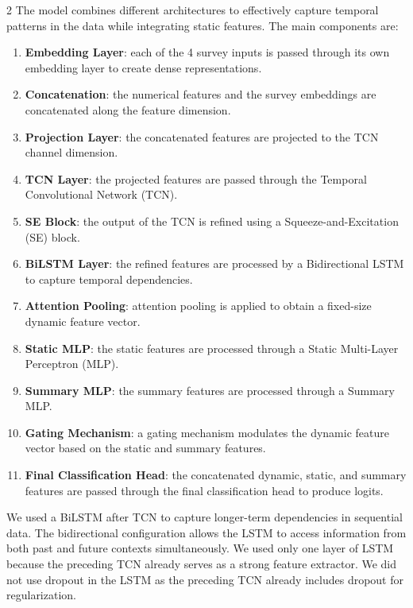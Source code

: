 \documentclass[11pt]{article}
\begin{document}
\begin{multicols}{2}
        The model combines different architectures to effectively capture temporal patterns in the data while integrating static features. The main components are:
        \begin{enumerate}[nosep]
            \item \textbf{Embedding Layer}: each of the 4 survey inputs is passed through its own embedding layer to create dense representations.
            \item \textbf{Concatenation}: the numerical features and the survey embeddings are concatenated along the feature dimension.
            \item \textbf{Projection Layer}: the concatenated features are projected to the TCN channel dimension.
            \item \textbf{TCN Layer}: the projected features are passed through the Temporal Convolutional Network (TCN).
            \item \textbf{SE Block}: the output of the TCN is refined using a Squeeze-and-Excitation (SE) block.
            \item \textbf{BiLSTM Layer}: the refined features are processed by a Bidirectional LSTM to capture temporal dependencies.
            \item \textbf{Attention Pooling}: attention pooling is applied to obtain a fixed-size dynamic feature vector.
            \item \textbf{Static MLP}: the static features are processed through a Static Multi-Layer Perceptron (MLP).
            \item \textbf{Summary MLP}: the summary features are processed through a Summary MLP.
            \item \textbf{Gating Mechanism}: a gating mechanism modulates the dynamic feature vector based on the static and summary features.
            \item \textbf{Final Classification Head}: the concatenated dynamic, static, and summary features are passed through the final classification head to produce logits.
        \end{enumerate}
        We used a BiLSTM after TCN to capture longer-term dependencies in sequential data. The bidirectional configuration allows the LSTM to access information from both past and future contexts simultaneously. We used only one layer of LSTM because the preceding TCN already serves as a strong feature extractor. We did not use dropout in the LSTM as the preceding TCN already includes dropout for regularization.
        

\end{multicols}
\end{document}
